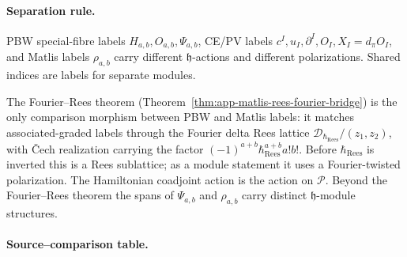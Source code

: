 \paragraph{Separation rule.}
PBW special-fibre labels \(H_{a,b},O_{a,b},\Psi_{a,b}\), CE/PV labels
\(c^I,u_I,\partial^I,O_I,X_I=d_\pi O_I\), and Matlis labels
\(\rho_{a,b}\) carry
different \(\mathfrak h\)-actions and different polarizations.  Shared
indices are labels for separate modules.

The Fourier--Rees theorem
(Theorem~\ref{thm:app-matlis-rees-fourier-bridge}) is the only
comparison morphism between PBW and Matlis labels: it matches
associated-graded labels through the Fourier delta Rees lattice
\(\mathcal D_{\hbar_{\mathrm{Rees}}}/(z_1,z_2)\), with \v{C}ech realization carrying the
factor \((-1)^{a+b}\hbar_{\mathrm{Rees}}^{a+b}a!b!\).  Before
\(\hbar_{\mathrm{Rees}}\) is inverted this is a Rees sublattice; as a module statement it uses a
Fourier-twisted polarization.  The Hamiltonian coadjoint action is the
action on \(\mathcal P\).  Beyond the Fourier--Rees theorem the spans of
\(\Psi_{a,b}\) and \(\rho_{a,b}\) carry distinct
\(\mathfrak h\)-module structures.

\paragraph{Source--comparison table.}

